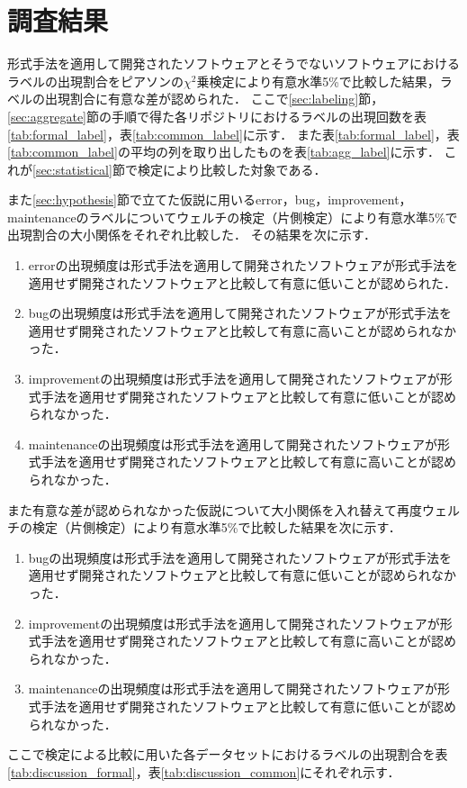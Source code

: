 \documentclass[main]{subfiles}
\begin{document}
\chapter{調査結果}

形式手法を適用して開発されたソフトウェアとそうでないソフトウェアにおけるラベルの出現割合をピアソンの\(\chi^2\)乗検定により有意水準5\%で比較した結果，ラベルの出現割合に有意な差が認められた．
ここで\ref{sec:labeling}節，\ref{sec:aggregate}節の手順で得た各リポジトリにおけるラベルの出現回数を表\ref{tab:formal_label}，表\ref{tab:common_label}に示す．
また表\ref{tab:formal_label}，表\ref{tab:common_label}の平均の列を取り出したものを表\ref{tab:agg_label}に示す．
これが\ref{sec:statistical}節で検定により比較した対象である．



また\ref{sec:hypothesis}節で立てた仮説に用いるerror，bug，improvement，maintenanceのラベルについてウェルチの検定（片側検定）により有意水準5\%で出現割合の大小関係をそれぞれ比較した．
その結果を次に示す．

\begin{enumerate}
	\item errorの出現頻度は形式手法を適用して開発されたソフトウェアが形式手法を適用せず開発されたソフトウェアと比較して有意に低いことが認められた．
	\item bugの出現頻度は形式手法を適用して開発されたソフトウェアが形式手法を適用せず開発されたソフトウェアと比較して有意に高いことが認められなかった．
	\item improvementの出現頻度は形式手法を適用して開発されたソフトウェアが形式手法を適用せず開発されたソフトウェアと比較して有意に低いことが認められなかった．
	\item maintenanceの出現頻度は形式手法を適用して開発されたソフトウェアが形式手法を適用せず開発されたソフトウェアと比較して有意に高いことが認められなかった．
\end{enumerate}

また有意な差が認められなかった仮説について大小関係を入れ替えて再度ウェルチの検定（片側検定）により有意水準5\%で比較した結果を次に示す．

\begin{enumerate}
	\item bugの出現頻度は形式手法を適用して開発されたソフトウェアが形式手法を適用せず開発されたソフトウェアと比較して有意に低いことが認められなかった．
	\item improvementの出現頻度は形式手法を適用して開発されたソフトウェアが形式手法を適用せず開発されたソフトウェアと比較して有意に高いことが認められなかった．
	\item maintenanceの出現頻度は形式手法を適用して開発されたソフトウェアが形式手法を適用せず開発されたソフトウェアと比較して有意に低いことが認められなかった．
\end{enumerate}

ここで検定による比較に用いた各データセットにおけるラベルの出現割合を表\ref{tab:discussion_formal}，表\ref{tab:discussion_common}にそれぞれ示す．


\end{document}
